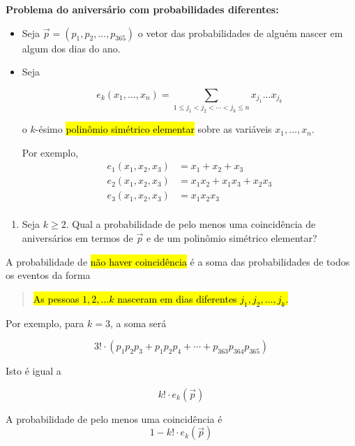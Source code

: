 \documentclass[
  11pt]{report}
\providecommand{\tightlist}{%
  \setlength{\itemsep}{0pt}\setlength{\parskip}{0pt}}
\begin{document}
\begin{rmdbox}

\textbf{Problema do aniversário com probabilidades diferentes:}

\begin{itemize}
\item
  Seja $\vec p = (p_1, p_2, \ldots, p_{365})$ o vetor das probabilidades de alguém nascer em algum dos dias do ano.
\item
  Seja

  \[
  e_k(x_1, \ldots, x_n) = 
  \sum_{1 \leq j_1 < j_2 < \cdots < j_k \leq n}
  \!\!\!\!\!\!\!\!\!\!\!\!\!\! x_{j_1} \ldots x_{j_k}
  \]

  o $k$-ésimo {\hl{polinômio simétrico elementar}} sobre as variáveis $x_1, \ldots, x_n$.

  Por exemplo,
  \[
  \begin{aligned}
    e_1(x_1, x_2, x_3) &= x_1 + x_2 + x_3 \\
    e_2(x_1, x_2, x_3) &= x_1x_2 + x_1x_3 + x_2x_3 \\
    e_3(x_1, x_2, x_3) &= x_1x_2x_3 \\
  \end{aligned}
  \]
\end{itemize}

\begin{enumerate}
\def\labelenumi{\alph{enumi}.}
\tightlist
\item
  Seja $k \geq 2$. Qual a probabilidade de pelo menos uma coincidência de aniversários em termos de $\vec p$ e de um polinômio simétrico elementar?
\end{enumerate}

\end{rmdbox}

A probabilidade de {\hl{não haver coincidência}} é a soma das probabilidades de todos os eventos da forma

\begin{quote}
{\hl{As pessoas $1, 2, \ldots k$ nasceram em dias diferentes $j_1, j_2, \ldots, j_k$.}}
\end{quote}

Por exemplo, para $k = 3$, a soma será

\[
3! \cdot (p_1 p_2 p_3 + p_1 p_2 p_4 + \cdots + p_{363} p_{364} p_{365})
\]

Isto é igual a

\[
k! \cdot e_k(\vec p)
\]

A probabilidade de pelo menos uma coincidência é
\[
1 - k! \cdot e_k(\vec p)
\]
\end{document}
